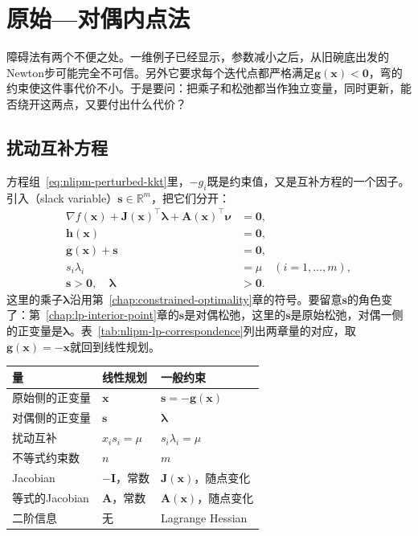 \section{原始—对偶内点法}
\label{sec:nlipm-primal-dual}

障碍法有两个不便之处。一维例子已经显示，参数减小之后，从旧碗底出发的Newton步可能完全不可信。另外它要求每个迭代点都严格满足$\bm{g}(\bm{x})<\bm{0}$，弯的约束使这件事代价不小。于是要问：把乘子和松弛都当作独立变量，同时更新，能否绕开这两点，又要付出什么代价？

\subsection{扰动互补方程}
\label{sec:nlipm-perturbed}

方程组~\eqref{eq:nlipm-perturbed-kkt}里，$-g_i$既是约束值，又是互补方程的一个因子。引入（slack variable）$\bm{s}\in\mathbb{R}^m$，把它们分开：
\begin{equation}
 \begin{aligned}
 \nabla f(\bm{x})+\bm{J}(\bm{x})^\top\bm{\lambda}+\bm{A}(\bm{x})^\top\bm{\nu}&=\bm{0},\\
 \bm{h}(\bm{x})&=\bm{0},\\
 \bm{g}(\bm{x})+\bm{s}&=\bm{0},\\
 s_i\lambda_i&=\mu\quad(i=1,\ldots,m),\\
 \bm{s}>\bm{0},\quad\bm{\lambda}&>\bm{0}.
 \end{aligned}
 \label{eq:nlipm-pd-system}
\end{equation}
这里的乘子$\bm{\lambda}$沿用第~\ref{chap:constrained-optimality}章的符号。要留意$\bm{s}$的角色变了：第~\ref{chap:lp-interior-point}章的$\bm{s}$是对偶松弛，这里的$\bm{s}$是原始松弛，对偶一侧的正变量是$\bm{\lambda}$。表~\ref{tab:nlipm-lp-correspondence}列出两章量的对应，取$\bm{g}(\bm{x})=-\bm{x}$就回到线性规划。

\begin{BookInlineTable}
  \centering
  \footnotesize
  \begin{tabular}{@{}lll@{}}
    \toprule
    量 & 线性规划 & 一般约束\\
    \midrule
    原始侧的正变量 & $\bm{x}$ & $\bm{s}=-\bm{g}(\bm{x})$\\
    对偶侧的正变量 & $\bm{s}$ & $\bm{\lambda}$\\
    扰动互补 & $x_is_i=\mu$ & $s_i\lambda_i=\mu$\\
    不等式约束数 & $n$ & $m$\\
    Jacobian & $-\bm{I}$，常数 & $\bm{J}(\bm{x})$，随点变化\\
    等式的Jacobian & $\bm{A}$，常数 & $\bm{A}(\bm{x})$，随点变化\\
    二阶信息 & 无 & Lagrange Hessian\\
    \bottomrule
  \end{tabular}
  \caption{线性规划内点法与一般约束内点法中各量的对应。}
  \label{tab:nlipm-lp-correspondence}
\end{BookInlineTable}

